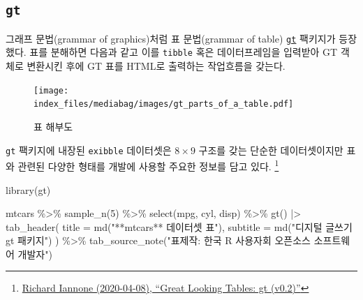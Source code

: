 \documentclass[
  letterpaper,
]{book}
\newenvironment{Shaded}{\begin{snugshade}}{\end{snugshade}}
\newcommand{\AttributeTok}[1]{\textcolor[rgb]{0.40,0.45,0.13}{#1}}
\newcommand{\DecValTok}[1]{\textcolor[rgb]{0.68,0.00,0.00}{#1}}
\newcommand{\FunctionTok}[1]{\textcolor[rgb]{0.28,0.35,0.67}{#1}}
\newcommand{\NormalTok}[1]{\textcolor[rgb]{0.00,0.23,0.31}{#1}}
\newcommand{\SpecialCharTok}[1]{\textcolor[rgb]{0.37,0.37,0.37}{#1}}
\newcommand{\StringTok}[1]{\textcolor[rgb]{0.13,0.47,0.30}{#1}}
\begin{document}
\hypertarget{rmd-gt}{%
\subsection{\texorpdfstring{\texttt{gt}}{gt}}\label{rmd-gt}}

그래프 문법(grammar of graphics)처럼 표 문법(grammar of table)
\href{https://github.com/rstudio/gt/}{\texttt{gt}} 팩키지가 등장했다.
표를 분해하면 다음과 같고 이를 \texttt{tibble} 혹은 데이터프레임을
입력받아 GT 객체로 변환시킨 후에 GT 표를 HTML로 출력하는 작업흐름을
갖는다.

\begin{figure}

{\centering \texttt{[image: index\_files/mediabag/images/gt\_parts\_of\_a\_table.pdf]}

}

\caption{표 해부도}

\end{figure}

\texttt{gt} 팩키지에 내장된 \texttt{exibble} 데이터셋은 \(8 \times 9\)
구조를 갖는 단순한 데이터셋이지만 표와 관련된 다양한 형태를 개발에
사용할 주요한 정보를 담고 있다. \footnote{\href{https://blog.rstudio.com/2020/04/08/great-looking-tables-gt-0-2/}{Richard
  Iannone (2020-04-08), ``Great Looking Tables: gt (v0.2)''}}

\begin{Shaded}
\begin{Highlighting}[]
\FunctionTok{library}\NormalTok{(gt)}

\NormalTok{mtcars }\SpecialCharTok{\%\textgreater{}\%} 
  \FunctionTok{sample\_n}\NormalTok{(}\DecValTok{5}\NormalTok{) }\SpecialCharTok{\%\textgreater{}\%} 
  \FunctionTok{select}\NormalTok{(mpg, cyl, disp) }\SpecialCharTok{\%\textgreater{}\%} 
  \FunctionTok{gt}\NormalTok{() }\SpecialCharTok{|\textgreater{}} 
  \FunctionTok{tab\_header}\NormalTok{(}
    \AttributeTok{title =} \FunctionTok{md}\NormalTok{(}\StringTok{"**mtcars** 데이터셋 표"}\NormalTok{),}
    \AttributeTok{subtitle =} \FunctionTok{md}\NormalTok{(}\StringTok{"디지털 글쓰기 \textasciigrave{}gt\textasciigrave{} 패키지"}\NormalTok{)}
\NormalTok{  ) }\SpecialCharTok{\%\textgreater{}\%}
  \FunctionTok{tab\_source\_note}\NormalTok{(}\StringTok{"표제작: 한국 R 사용자회 오픈소스 소프트웨어 개발자"}\NormalTok{)}
\end{Highlighting}
\end{Shaded}
\end{document}
